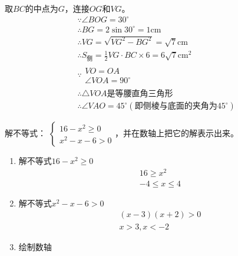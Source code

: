 \documentclass[answers]{exam}
\begin{document}
\begin{questions}
\begin{solution}
		取$BC$的中点为$G$，连接$OG$和$VG$。
		\begin{align*}
			 & \because \angle{BOG} = 30^\circ                                             \\
			 & \therefore BG = 2\sin30^\circ = 1 \text{cm}                                 \\
			 & \therefore VG = \sqrt{VG^2 - BG^2} = \sqrt{7}\text{cm}                      \\
			 & \therefore S_{\text{侧}} = \frac12VG\cdot BC \times 6 = 6\sqrt{7}\text{cm}^2 \\
			 & \because
			\begin{array}{l}
				VO = OA \\
				\angle{VOA} = 90^\circ
			\end{array}                                                          \\
			 & \therefore \triangle{VOA}\text{是等腰直角三角形}                                    \\
			 & \therefore \angle{VAO} = 45^\circ (\text{即侧棱与底面的夹角为}45^\circ)
		\end{align*}
	\end{solution}

	\question 解不等式： 	\begin{math}
		\begin{cases}
			16 - x^2 \geqslant 0 \\
			x^2 - x - 6 > 0
		\end{cases}，并在数轴上把它的解表示出来。
	\end{math}
	\begin{solution}
		\begin{enumerate}[label=\Roman*.]
			\item 解不等式$16 - x^2 \geqslant 0$
			      \begin{align*}
				      16  \geqslant x^2 \\
				      -4 \leqslant x \leqslant 4
			      \end{align*}
			\item 解不等式$x^2 - x - 6 > 0$
			      \begin{align*}
				      (x-3)(x+2) > 0 \\
				      x > 3, x < -2
			      \end{align*}
			\item 绘制数轴

\end{enumerate}
\end{solution}
\end{questions}
\end{document}
